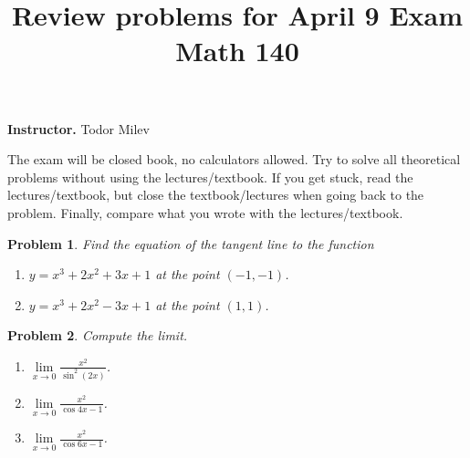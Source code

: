 \documentclass{article}
\title{
Review problems for April 9 Exam\\
Math 140 \\
}
\date{}
\newtheorem{problem}{Problem}
\begin{document}
\maketitle
\textbf{Instructor.} Todor Milev

The exam will be closed book, no calculators allowed. Try to solve all theoretical problems without using the lectures/textbook. If you get stuck, read the lectures/textbook, but close the textbook/lectures when going back to the problem. Finally, compare what you wrote with the lectures/textbook.
\begin{problem}
Find the equation of the tangent line to the function 
\begin{enumerate}
\item $y=x^3+2x^2+3x+1 $ at the point $(-1, -1)$.  \hfill{~}  
\item $y=x^3+2x^2-3x+1 $ at the point $(1, 1)$. 
\hfill{~}  
\end{enumerate}
\end{problem}

\begin{problem}Compute the limit.
\begin{enumerate}
\item $\lim\limits_{x\to 0} \frac{x^2}{\sin^2(2x)}$. \hfill{~}  
\item $\lim\limits_{x\to 0} \frac{x^2}{ \cos 4x -1} $.
\hfill{~}  
\item $\lim\limits_{x\to 0} \frac{x^2}{ \cos 6x -1} $.
\hfill{~}  
\end{enumerate}
\end{problem}
\end{document}
